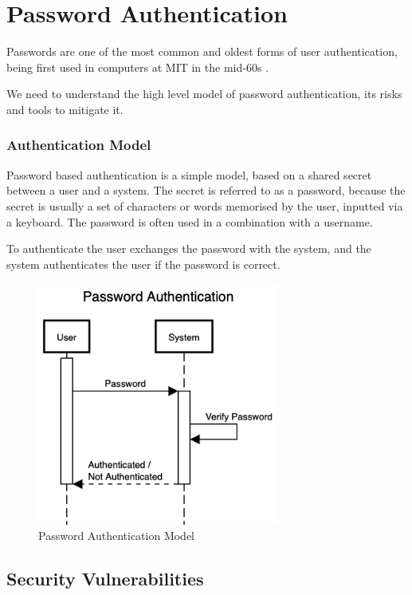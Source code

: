 \section{Password Authentication}
\label{section:password-authentication}

Passwords are one of the most common and oldest forms of user authentication, being first used in computers at MIT in the mid-60s \cite{mcmillan2012password}.

We need to understand the high level model of password authentication, its risks and tools to mitigate it.

\subsubsection{Authentication Model}

Password based authentication is a simple model, based on a shared secret between a user and a system. The secret is referred to as a password, because the secret is usually a set of characters or words memorised by the user, inputted via a keyboard.
The password is often used in a combination with a username.

To authenticate the user exchanges the password with the system, and the system authenticates the user if the password is correct.

\begin{figure}[h]
	\centering
	\includegraphics[height=8cm]{images/password-authentication}
	\caption{Password Authentication Model}
	\label{fig:password-authentication}
\end{figure}

\subsection{Security Vulnerabilities}
\label{label:password-vulnerabilities}

